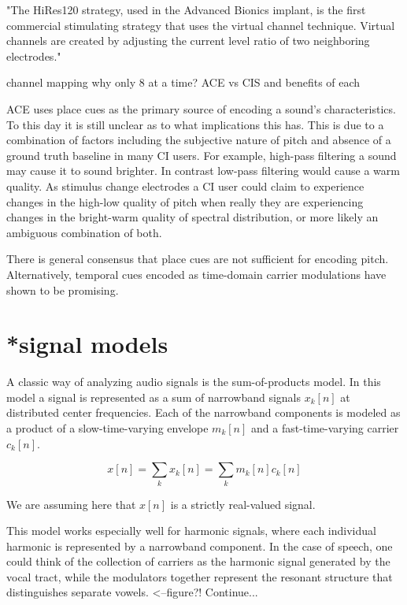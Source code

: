 \documentclass [11pt, proquest] {uwthesis}[2015/03/03]
\begin{document}
"The HiRes120 strategy, used in the Advanced Bionics implant, is the first commercial stimulating strategy that uses the virtual channel technique. Virtual channels are created by adjusting the current level ratio of two neighboring electrodes."

channel mapping
	why only 8 at a time?
	ACE vs CIS and benefits of each
	
	
	
	ACE uses place cues as the primary source of encoding a sound's characteristics.  To this day it is still unclear as to what implications this has.  This is due to a combination of factors including the subjective nature of pitch and absence of a ground truth baseline in many CI users.  For example, high-pass filtering a sound may cause it to sound brighter.  In contrast low-pass filtering would cause a warm quality.  As stimulus change electrodes a CI user could claim to experience changes in the high-low quality of pitch when really they are experiencing changes in the bright-warm quality of spectral distribution, or more likely an ambiguous combination of both.

There is general consensus that place cues are not sufficient for encoding pitch.  Alternatively, temporal cues encoded as time-domain carrier modulations have shown to be promising.

\section{*signal models}

A classic way of analyzing audio signals is the sum-of-products model.  In this model a signal is represented as a sum of narrowband signals $x_k[n]$ at distributed center frequencies.  Each of the narrowband components is modeled as a product of a slow-time-varying envelope $m_k[n]$ and a fast-time-varying carrier $c_k[n]$.


$$x[n] = \sum\limits_k x_k[n] = \sum\limits_k m_k[n] c_k[n]$$


We are assuming here that $x[n]$ is a strictly real-valued signal.

This model works especially well for harmonic signals, where each individual harmonic is represented by a narrowband component.  In the case of speech, one could think of the collection of carriers as the harmonic signal generated by the vocal tract, while the modulators together represent the resonant structure that distinguishes separate vowels. <--figure?!  Continue...
\end{document}
